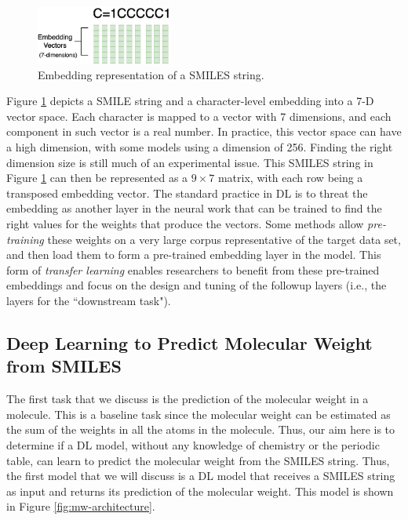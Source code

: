   \begin{figure}[htbp]
        \centering
        \includegraphics[width=0.4\textwidth]{figures/smileembedding.png}
        \caption{Embedding representation of a SMILES string.}
        \label{fig:smiles-to-embed}
    \end{figure}
Figure \ref{fig:smiles-to-embed} depicts a SMILE string and a  character-level embedding into a 7-D vector space. Each character is mapped to a vector with 7 dimensions, and each component in such vector is a real number.  In practice, this vector space can have a high dimension, with some models using a dimension of 256. Finding the right dimension size is still much of an experimental issue. This SMILES  string in 
Figure \ref{fig:smiles-to-embed} can then be represented as  a $9 \times 7$ matrix, with each row being a transposed embedding vector.
The standard practice in DL is to threat the embedding as  another layer in the neural work that can be trained to find the right values for the weights that produce the vectors. Some methods allow {\em pre-training} these weights on a very large corpus representative of the target data set, and then load them to form  a pre-trained embedding layer in the model. This form of {\em transfer learning} enables researchers to benefit from these pre-trained embeddings  and 
 focus on the design and tuning of the followup layers (i.e., the layers for the ``downstream task").

    \subsection{Deep Learning to Predict Molecular Weight from SMILES}
    The first task that we discuss is the prediction of the molecular weight in a molecule. This is a baseline task since the molecular weight can be estimated as the sum of the weights in all the atoms in the molecule. Thus, our aim here is to determine if  a DL model, without any knowledge of chemistry or the periodic table, can learn to predict the molecular weight from the SMILES string. Thus, the first model that we will discuss is a DL model that receives a SMILES string as input and returns its prediction of the molecular weight. This model is shown in Figure \ref{fig:mw-architecture}.
    
